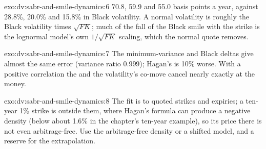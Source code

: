 \begin{solution}{exo:dv:sabr-and-smile-dynamics:6}
70.8, 59.9 and 55.0 basis points a year, against 28.8\%, 20.0\% and 15.8\% in Black volatility. A normal volatility is
roughly the Black volatility times $\sqrt{FK}$; much of the fall of the Black smile with the strike is the lognormal model's
own $1/\sqrt{FK}$ scaling, which the normal quote removes.
\end{solution}

\begin{solution}{exo:dv:sabr-and-smile-dynamics:7}
The minimum-variance and Black deltas give almost the same error (variance ratio 0.999); Hagan's is 10\% worse. With a
positive correlation the  and the volatility's co-move cancel nearly exactly at the money.
\end{solution}

\begin{solution}{exo:dv:sabr-and-smile-dynamics:8}
The fit is to quoted strikes and expiries; a ten-year 1\% strike is outside them, where Hagan's formula can produce a
negative density (below about 1.6\% in the chapter's ten-year example), so its price there is not even arbitrage-free.
Use the arbitrage-free density or a shifted model, and a reserve for the extrapolation.
\end{solution}

